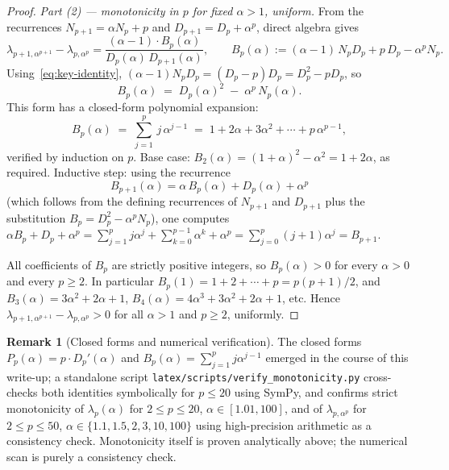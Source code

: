 \documentclass[11pt,a4paper]{article}
\theoremstyle{definition}
\newtheorem{remark}{Remark}[section]
\begin{document}
\begin{proof}
\medskip

\noindent\emph{Part (2) --- monotonicity in $p$ for fixed $\alpha > 1$, uniform.} From the recurrences $N_{p+1} = \alpha N_p + p$ and $D_{p+1} = D_p + \alpha^p$, direct algebra gives
\[
  \lambda_{p+1,\alpha^{p+1}} - \lambda_{p,\alpha^p}
  = \frac{(\alpha-1)\cdot B_p(\alpha)}{D_p(\alpha)\,D_{p+1}(\alpha)},
  \qquad
  B_p(\alpha) := (\alpha-1)\, N_p D_p + p\, D_p - \alpha^p N_p.
\]
Using~\eqref{eq:key-identity}, $(\alpha-1) N_p D_p = (D_p - p) D_p = D_p^2 - p D_p$, so
\[
  B_p(\alpha) \;=\; D_p(\alpha)^2 \;-\; \alpha^p\, N_p(\alpha).
\]
This form has a closed-form polynomial expansion:
\begin{equation}\label{eq:Bp-closed}
  B_p(\alpha) \;=\; \sum_{j=1}^{p}\, j\, \alpha^{j-1}
  \;=\; 1 + 2\alpha + 3\alpha^2 + \cdots + p\, \alpha^{p-1},
\end{equation}
verified by induction on $p$. Base case: $B_2(\alpha) = (1+\alpha)^2 - \alpha^2 = 1 + 2\alpha$, as required. Inductive step: using the recurrence
\[
  B_{p+1}(\alpha) = \alpha\, B_p(\alpha) + D_p(\alpha) + \alpha^p
\]
(which follows from the defining recurrences of $N_{p+1}$ and $D_{p+1}$ plus the substitution $B_p = D_p^2 - \alpha^p N_p$), one computes $\alpha B_p + D_p + \alpha^p = \sum_{j=1}^{p} j\alpha^j + \sum_{k=0}^{p-1}\alpha^k + \alpha^p = \sum_{j=0}^{p} (j+1)\alpha^j = B_{p+1}$.

All coefficients of $B_p$ are strictly positive integers, so $B_p(\alpha) > 0$ for every $\alpha > 0$ and every $p \geq 2$. In particular $B_p(1) = 1 + 2 + \cdots + p = p(p+1)/2$, and $B_3(\alpha) = 3\alpha^2 + 2\alpha + 1$, $B_4(\alpha) = 4\alpha^3 + 3\alpha^2 + 2\alpha + 1$, etc. Hence $\lambda_{p+1,\alpha^{p+1}} - \lambda_{p,\alpha^p} > 0$ for all $\alpha > 1$ and $p \geq 2$, uniformly.
\end{proof}

\begin{remark}[Closed forms and numerical verification]
The closed forms $P_p(\alpha) = p \cdot D_p'(\alpha)$ and $B_p(\alpha) = \sum_{j=1}^p j\alpha^{j-1}$ emerged in the course of this write-up; a standalone script \texttt{latex/scripts/verify\_monotonicity.py} cross-checks both identities symbolically for $p \leq 20$ using SymPy, and confirms strict monotonicity of $\lambda_p(\alpha)$ for $2 \leq p \leq 20$, $\alpha \in [1.01, 100]$, and of $\lambda_{p,\alpha^p}$ for $2 \leq p \leq 50$, $\alpha \in \{1.1, 1.5, 2, 3, 10, 100\}$ using high-precision arithmetic as a consistency check. Monotonicity itself is proven analytically above; the numerical scan is purely a consistency check.
\end{remark}
\end{document}
